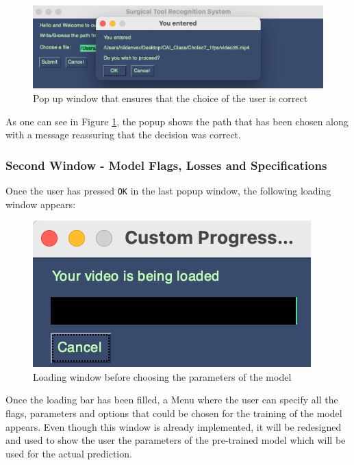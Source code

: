 \documentclass{article}
\begin{document}
\begin{figure}[H]
    \centering
    \includegraphics[width = \linewidth]{Confirm_window.png}
    \caption{Pop up window that ensures that the choice of the user is correct}
    \label{fig:confirm}
\end{figure}
\noindent
As one can see in Figure \ref{fig:confirm}, the popup shows the path that has been chosen along with a message reassuring that the decision was correct.

\subsubsection{Second Window - Model Flags, Losses and Specifications}
Once the user has pressed \texttt{OK} in the last popup window, the following loading window appears:

\begin{figure}[H]
    \centering
    \includegraphics[width = 0.4\linewidth]{Loading_window.png}
    \caption{Loading window before choosing the parameters of the model}
    \label{fig:loading}
\end{figure}
\noindent
Once the loading bar has been filled, a Menu where the user can specify all the flags, parameters and options that could be chosen for the training of the model appears. 
Even though this window is already implemented, it will be redesigned and used to show the user the parameters of the pre-trained model which will be used for the actual prediction.
\end{document}
